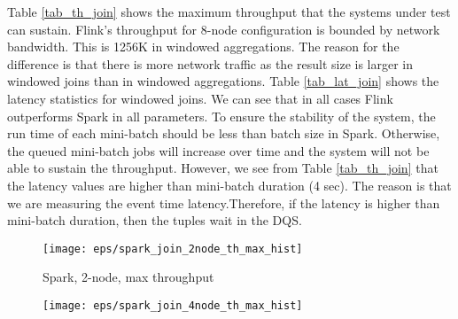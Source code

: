 {Table \ref{tab_th_join} shows the maximum throughput that the systems under test can sustain.  Flink's throughput for 8-node configuration is bounded by network bandwidth. This is 1256K in windowed aggregations. The reason for the difference is that there is more network traffic as the result size is larger in windowed joins than in windowed aggregations. Tab\-le \ref{tab_lat_join} shows the latency statistics for windowed joins. We can see that  
in all cases Flink outperforms Spark in all parameters. To ensure the stability of the system, the run time of each mini-batch should be less than batch size in Spark. Otherwise, the queued mini-batch jobs will increase over time and the system will not be able to sustain the throughput. However, we see from Table \ref{tab_th_join} that the latency values are higher than mini-batch duration (4 sec). The reason is that we are measuring the event time latency.Therefore, if the latency is higher than mini-batch duration, then the tuples wait in the DQS.
















































\begin{figure*}
    \centering
   \begin{subfigure}[b]{0.3\textwidth}
       \texttt{[image: eps/spark\_join\_2node\_th\_max\_hist]}

       \caption{Spark, 2-node, max  throughput}
                       \label{fig_spark_join_2node_max}
   \end{subfigure}%
   \begin{subfigure}[b]{0.3\textwidth}
       \texttt{[image: eps/spark\_join\_4node\_th\_max\_hist]}


\end{subfigure}
\end{figure*}}
